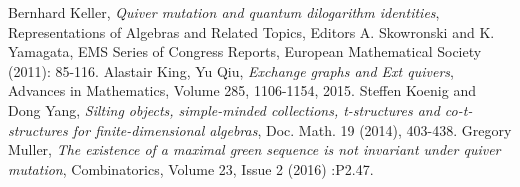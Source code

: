 \documentclass{beamer}
\begin{document}
\begin{frame}[allowframebreaks]
\begin{thebibliography}{10}
 Bernhard Keller, \textit{Quiver mutation and quantum dilogarithm identities}, Representations of Algebras and Related Topics, Editors A. Skowronski and K. Yamagata, EMS Series of Congress Reports, European Mathematical Society (2011): 85-116.
 Alastair King, Yu Qiu, \textit{Exchange graphs and Ext quivers}, Advances in Mathematics, Volume 285, 1106-1154, 2015.
 Steffen Koenig and Dong Yang, \textit{Silting objects, simple-minded collections, t-structures and co-t-structures for finite-dimensional algebras}, Doc. Math. 19 (2014), 403-438. 
 Gregory Muller, \textit{The existence of a maximal green sequence is not invariant under quiver mutation}, Combinatorics, Volume 23, Issue 2 (2016) :P2.47. 
%
   
   

\end{thebibliography}
\end{frame}
\end{document}
